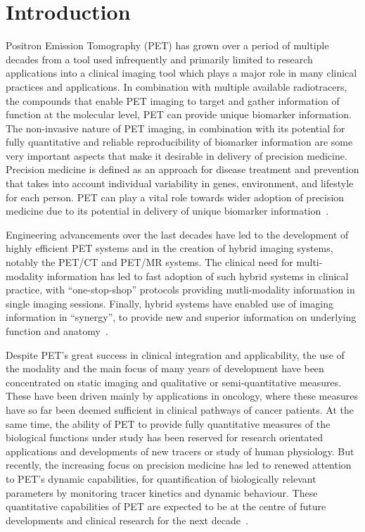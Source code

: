 \chapter{Introduction}
Positron Emission Tomography (PET) has grown over a period of multiple decades from a tool used infrequently and primarily limited to research applications into a clinical imaging tool which plays a major role in many clinical practices and applications. 
In combination with multiple available radiotracers, the compounds that enable PET imaging to target and gather information of function at the molecular level, PET can provide unique biomarker information. The non-invasive nature of PET imaging, in combination with its potential for fully quantitative and reliable reproducibility of biomarker information are some very important aspects that make it desirable in delivery of precision medicine. Precision medicine is defined as an approach for disease treatment and prevention that takes into account individual variability in genes, environment, and lifestyle for each person. PET can play a vital role towards wider adoption of precision medicine due to its potential in delivery of unique biomarker information~\cite{Subramaniam2017}.

Engineering advancements over the last decades have led to the development of highly efficient PET systems and in the creation of hybrid imaging systems, notably the PET/CT and PET/MR systems. The clinical need for multi-modality information has led to fast adoption of such hybrid systems in clinical practice, with “one-stop-shop” protocols providing mutli-modality information in single imaging sessions. Finally, hybrid systems have enabled use of imaging information in “synergy”, to provide new and superior information on underlying function and anatomy~\cite{Besson2020}.

Despite PET’s great success in clinical integration and applicability, the use of the modality and the main focus of many years of development have been concentrated on static imaging and qualitative or semi-quantitative measures. These have been driven mainly by applications in oncology, where these measures have so far been deemed sufficient in clinical pathways of cancer patients. At the same time, the ability of PET to provide fully quantitative measures of the biological functions under study has been reserved for research orientated applications and developments of new tracers or study of human physiology. 
But recently, the increasing focus on precision medicine has led to renewed attention to PET’s dynamic capabilities, for quantification of biologically relevant parameters by monitoring tracer kinetics and dynamic behaviour. These quantitative capabilities of PET are expected to be at the centre of future developments and clinical research for the next decade~\cite{Lammertsma2017,Meikle2021}.

